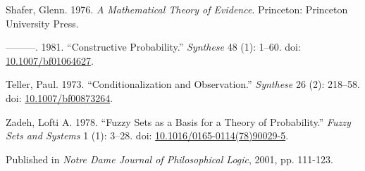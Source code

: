 \documentclass[
  10pt,
  letterpaper,
  DIV=11,
  numbers=noendperiod,
  twoside]{scrartcl}
\newlength{\cslhangindent}
\newenvironment{CSLReferences}[2] %
 {\begin{list}{}{%
  \setlength{\itemindent}{0pt}
  \setlength{\leftmargin}{0pt}
  \setlength{\parsep}{0pt}
  \ifodd #1
   \setlength{\leftmargin}{\cslhangindent}
   \setlength{\itemindent}{-1\cslhangindent}
  \fi
  \setlength{\itemsep}{#2\baselineskip}}}
 {\end{list}}
\begin{document}
\begin{CSLReferences}{1}{0}
Shafer, Glenn. 1976. \emph{A Mathematical Theory of Evidence}.
Princeton: Princeton University Press.

---------. 1981. {``Constructive Probability.''} \emph{Synthese} 48 (1):
1--60. doi:
\href{https://doi.org/10.1007/bf01064627}{10.1007/bf01064627}.

Teller, Paul. 1973. {``Conditionalization and Observation.''}
\emph{Synthese} 26 (2): 218--58. doi:
\href{https://doi.org/10.1007/bf00873264}{10.1007/bf00873264}.

Zadeh, Lofti A. 1978. {``Fuzzy Sets as a Basis for a Theory of
Probability.''} \emph{Fuzzy Sets and Systems} 1 (1): 3--28. doi:
\href{https://doi.org/10.1016/0165-0114(78)90029-5}{10.1016/0165-0114(78)90029-5}.

\end{CSLReferences}



\noindent Published in\emph{
Notre Dame Journal of Philosophical Logic}, 2001, pp. 111-123.
\end{document}
